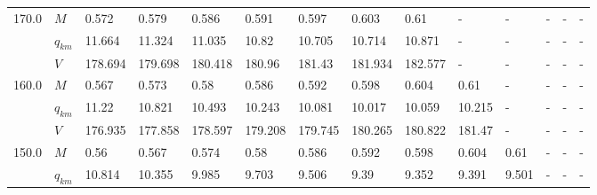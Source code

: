 \begin{tabular}{|l|l|llllllllllll|}
\hline
170.0 & $M$ &    0.572 &    0.579 &    0.586 &                     0.591 &    0.597\cellcolor{green} &                     0.603 &                      0.61 &                         - &                         - &                         - &                         - &                         - \\
      & $q_{km}$ &   11.664 &   11.324 &   11.035 &                     10.82 &   10.705\cellcolor{green} &                    10.714 &                    10.871 &                         - &                         - &                         - &                         - &                         - \\
      & $V$ &  178.694 &  179.698 &  180.418 &                    180.96 &   181.43\cellcolor{green} &                   181.934 &                   182.577 &                         - &                         - &                         - &                         - &                         - \\
\hline
160.0 & $M$ &    0.567 &    0.573 &     0.58 &                     0.586 &                     0.592 &    0.598\cellcolor{green} &                     0.604 &                      0.61 &                         - &                         - &                         - &                         - \\
      & $q_{km}$ &    11.22 &   10.821 &   10.493 &                    10.243 &                    10.081 &   10.017\cellcolor{green} &                    10.059 &                    10.215 &                         - &                         - &                         - &                         - \\
      & $V$ &  176.935 &  177.858 &  178.597 &                   179.208 &                   179.745 &  180.265\cellcolor{green} &                   180.822 &                    181.47 &                         - &                         - &                         - &                         - \\
\hline
150.0 & $M$ &     0.56 &    0.567 &    0.574 &                      0.58 &                     0.586 &                     0.592 &    0.598\cellcolor{green} &                     0.604 &                      0.61 &                         - &                         - &                         - \\
      & $q_{km}$ &   10.814 &   10.355 &    9.985 &                     9.703 &                     9.506 &                      9.39 &    9.352\cellcolor{green} &                     9.391 &                     9.501 &                         - &                         - &                         - \\

\end{tabular}
